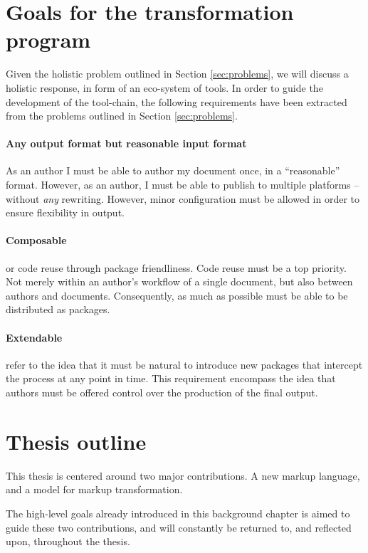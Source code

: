 \documentclass{scrreprt}
\begin{document}
\section{Goals for the transformation program}
\label{sec:goals-for-the-transformation-program}
Given the holistic problem outlined in Section \ref{sec:problems}, we will discuss a holistic response, in form of an eco-system of tools. In order to guide the development of the tool-chain, the following requirements have been extracted from the problems outlined in Section \ref{sec:problems}.

\paragraph{Any output format but reasonable input format}
As an author I must be able to author my document once, in a ``reasonable'' format. However, as an author, I must be able to publish to multiple platforms -- without \emph{any} rewriting. However, minor configuration must be allowed in order to ensure flexibility in output.

\paragraph{Composable} or code reuse through package friendliness. Code reuse must be a top priority. Not merely within an author's workflow of a single document, but also between authors and documents. Consequently, as much as possible must be able to be distributed as packages.

\paragraph{Extendable} refer to the idea that it must be natural to introduce new packages that intercept the process at any point in time. This requirement encompass the idea that authors must be offered control over the production of the final output.




\section{Thesis outline}
This thesis is centered around two major contributions. A new markup language, and a model for markup transformation.

The high-level goals already introduced in this background chapter is aimed to guide these two contributions, and will constantly be returned to, and reflected upon, throughout the thesis.
\end{document}
